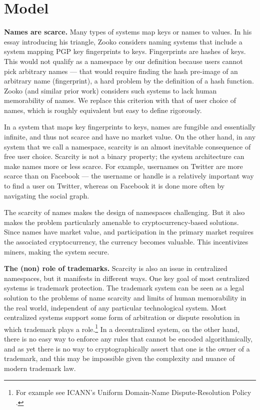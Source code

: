 \section{Model}
\label{sec:model}

{\bf Names are scarce.} Many types of systems map keys or names to values. In his essay introducing his triangle, Zooko considers naming systems that include a system mapping PGP key fingerprints to keys. Fingerprints are hashes of keys. This would not qualify as a namespace by our definition because users cannot pick arbitrary names --- that would require finding the hash pre-image of an arbitrary name (fingerprint), a hard problem by the definition of a hash function. Zooko (and similar prior work) considers such systems to lack human memorability of names. We replace this criterion with that of user choice of names, which is roughly equivalent but easy to define rigorously. 

In a system that maps key fingerprints to keys, names are fungible and essentially infinite, and thus not scarce and have no market value. On the other hand, in any system that we call a namespace, scarcity is an almost inevitable consequence of free user choice. Scarcity is not a binary property; the system architecture can make names more or less scarce. For example, usernames on Twitter are more scarce than on Facebook --- the username or handle is a relatively important way to find a user on Twitter, whereas on Facebook it is done more often by navigating the social graph.

The scarcity of names makes the design of namespaces challenging. But it also makes the problem particularly amenable to cryptocurrency-based solutions. Since names have market value, and participation in the primary market requires the associated cryptocurrency, the currency becomes valuable. This incentivizes miners, making the system secure.

{\bf The (non) role of trademarks.} Scarcity is also an issue in centralized namespaces, but it manifests in different ways. One key goal of most centralized systems is trademark protection. The trademark system can be seen as a legal solution to the problems of name scarcity and limits of human memorability in the real world, independent of any particular technological system. Most centralized systems support some form of arbitration or dispute resolution in which trademark plays a role.\footnote{For example see ICANN's Uniform Domain-Name Dispute-Resolution Policy \cite{}.} In a decentralized system, on the other hand, there is no easy way to enforce any rules that cannot be encoded algorithmically, and as yet there is no way to cryptographically assert that one is the owner of a trademark, and this may be impossible given the complexity and nuance of modern trademark law.

